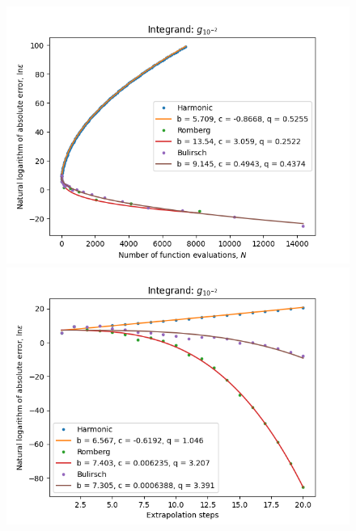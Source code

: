 \begin{figure}[H]
\centering
\begin{minipage}{0.45\textwidth}
\centering
\includegraphics[scale=0.45]{../results/romberg_plots/g_hundredth_hp_trend.png}
\end{minipage}
\begin{minipage}{0.45\textwidth}
\centering
\includegraphics[scale=0.45]{../results/romberg_plots/g_hundredth_hp_steps.png}
\end{minipage}
\end{figure}

